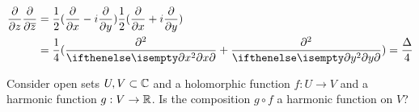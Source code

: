 \documentclass{homework}
\begin{document}
                                                \begin{solution}
                                                \begin{align*}
                                                \pfrac{}{z}\pfrac{}{\conj{z}} &= \frac{1}{2}(\pfrac{}{x} - i\pfrac{}{y})\frac{1}{2}(\pfrac{}{x} + i\pfrac{}{y})\\
                                                &= \frac{1}{4}(\ppfrac{}{x} + \ppfrac{}{y}) = \frac{\Delta}{4}
                                                \end{align*}
                                                \end{solution}

                                                \begin{problem}\label{composition-holomorphic-harmonic}Consider open
                                                  sets $U, V \subset \mathbb{C}$ and a holomorphic function $f : U \to V$ and
                                                    a harmonic function $g : V \to \mathbb{R}$.  Is the composition $g \circ f$
                                                      a harmonic function on $V$?
                                                      \end{problem}
\end{document}
